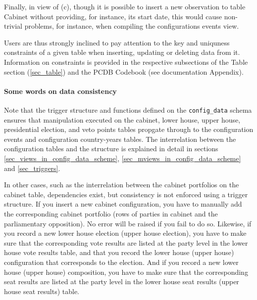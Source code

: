 Finally, in view of (c), though it is possible to insert a new observation to table Cabinet without providing, for instance, its start date, this would cause non-trivial problems, for instance, when compiling the configurations events view.

Users are thus strongly inclined to pay attention to the key and uniquness constraints of a given table when inserting, updating or deleting data from it. Information on constraints is provided in the respective subsections of the Table section (\ref{sec_table}) and the PCDB Codebook (see documentation Appendix).

\paragraph{Some words on data consistency}

Note that the trigger structure and functions defined on the \texttt{config\_data} schema ensures that manipulation executed on the cabinet, lower house, upper house, presidential election, and veto points tables propgate through to the configuration events and configuration country-years tables.
The interrelation between the configuration tables and the structure is explained in detail in sections \ref{sec_views_in_config_data_scheme}, \ref{sec_mviews_in_config_data_scheme} and \ref{sec_triggers}.

In other cases, such as the interrelation between the cabinet portfolios on the cabinet table, dependencies exist, but consistency is not enforced using a trigger structure. If you insert a new cabinet configuration, you have to manually add the corresponding cabinet portfolio (rows of parties in cabinet and the parliamentary opposition). No error will be raised if you fail to do so.
Likewise, if you record a new lower house election (upper house election), you have to make sure that the corresponding vote results are listed at the party level in the lower house vote results table, and that you record the lower house (upper house) configuration that corresponds to the election.
And if you record a new lower house (upper house) composition, you have to make sure that the corresponding seat results are listed at the party level in the lower house seat results (upper house seat results) table. 

  
  
  
  